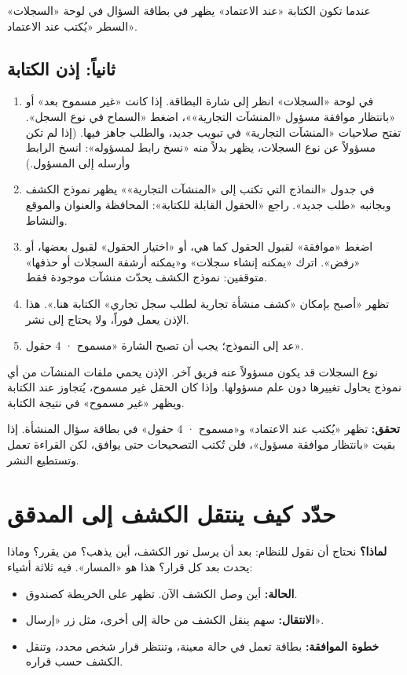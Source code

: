 عندما تكون الكتابة «عند الاعتماد» يظهر في بطاقة السؤال في لوحة «السجلات» السطر «يُكتب عند الاعتماد».

\subsection{ثانياً: إذن الكتابة}

\begin{enumerate}
\item في لوحة «السجلات» انظر إلى شارة البطاقة. إذا كانت «غير مسموح بعد» أو «بانتظار موافقة مسؤول «المنشآت التجارية»»، اضغط «السماح في نوع السجل». تفتح صلاحيات «المنشآت التجارية» في تبويب جديد، والطلب جاهز فيها. (إذا لم تكن مسؤولاً عن نوع السجلات، يظهر بدلاً منه «نسخ رابط لمسؤوله»: انسخ الرابط وأرسله إلى المسؤول.)
\item في جدول «النماذج التي تكتب إلى «المنشآت التجارية»» يظهر نموذج الكشف وبجانبه «طلب جديد». راجع «الحقول القابلة للكتابة»: المحافظة والعنوان والموقع والنشاط.
\item اضغط «موافقة» لقبول الحقول كما هي، أو «اختيار الحقول» لقبول بعضها، أو «رفض». اترك «يمكنه إنشاء سجلات» و«يمكنه أرشفة السجلات أو حذفها» متوقفين: نموذج الكشف يحدّث منشآت موجودة فقط.
\item تظهر «أصبح بإمكان «كشف منشأة تجارية لطلب سجل تجاري» الكتابة هنا.». هذا الإذن يعمل فوراً، ولا يحتاج إلى نشر.
\item عد إلى النموذج؛ يجب أن تصبح الشارة «مسموح · 4 حقول».
\end{enumerate}

\begin{rcnote}
نوع السجلات قد يكون مسؤولاً عنه فريق آخر. الإذن يحمي ملفات المنشآت من أي نموذج يحاول تغييرها دون علم مسؤولها. وإذا كان الحقل غير مسموح، يُتجاوز عند الكتابة ويظهر «غير مسموح» في نتيجة الكتابة.
\end{rcnote}

\textbf{تحقق:} تظهر «يُكتب عند الاعتماد» و«مسموح · 4 حقول» في بطاقة سؤال المنشأة. إذا بقيت «بانتظار موافقة مسؤول»، فلن تُكتب التصحيحات حتى يوافق، لكن القراءة تعمل وتستطيع النشر.

\section{حدّد كيف ينتقل الكشف إلى المدقق}
\label{sec:build-journey}

\textbf{لماذا؟} نحتاج أن نقول للنظام: بعد أن يرسل نور الكشف، أين يذهب؟ من يقرر؟ وماذا يحدث بعد كل قرار؟ هذا هو «المسار». فيه ثلاثة أشياء:

\begin{itemize}
\item \textbf{الحالة:} أين وصل الكشف الآن. تظهر على الخريطة كصندوق.
\item \textbf{الانتقال:} سهم ينقل الكشف من حالة إلى أخرى، مثل زر «إرسال».
\item \textbf{خطوة الموافقة:} بطاقة تعمل في حالة معينة، وتنتظر قرار شخص محدد، وتنقل الكشف حسب قراره.
\end{itemize}

